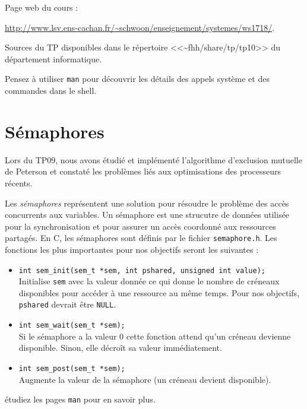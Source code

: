 \documentclass[11pt]{article}
\newcommand{\numtd}{10}
\newcommand{\titretd}{Les threads}
\begin{document}
\entete{\numtd}{\titretd}

Page web du cours :                                                                                                                                                                                                                                            
\begin{center}
\url{http://www.lsv.ens-cachan.fr/~schwoon/enseignement/systemes/ws1718/}.
\end{center}

Sources du TP disponibles dans le répertoire <<\textasciitilde{}fhh/share/tp/tp10>> du département informatique.

Pensez à utiliser \texttt{man} pour découvrir les détails
des appels système et des commandes dans le shell.

\section{Sémaphores}

Lors du TP09, nous avons étudié et implémenté l'algorithme d'exclusion mutuelle de Peterson et constaté les problèmes liés aux optimisations des processeurs récents.

Les \emph{sémaphores} représentent une solution pour résoudre le
problème des accès concurrents aux variables. Un sémaphore est
une strucutre de données utilisée pour la synchronisation et pour
assurer un accès coordonné aux ressources partagés. En C,
les sémaphores sont définis par le fichier
\texttt{semaphore.h}. Les fonctions les plus importantes pour nos
objectifs seront les suivantes :
%
\begin{itemize}
\item
  \verb|int sem_init(sem_t *sem, int pshared, unsigned int value);|\\ 
  Initialise \verb|sem| avec la valeur donnée ce qui donne le nombre
  de créneaux disponibles pour accéder à une ressource au même temps.
  Pour nos objectifs, \verb|pshared| devrait être \verb|NULL|.
\item \verb|int sem_wait(sem_t *sem);|\\ Si le sémaphore a la valeur 0
  cette fonction attend qu'un créneau devienne disponible. Sinon,
  elle décroît sa valeur immédiatement.
\item \verb|int sem_post(sem_t *sem);|\\ Augmente la valeur de la
  sémaphore (un créneau devient disponible).
\end{itemize}
%
étudiez les pages \verb|man| pour en savoir plus.
\end{document}
